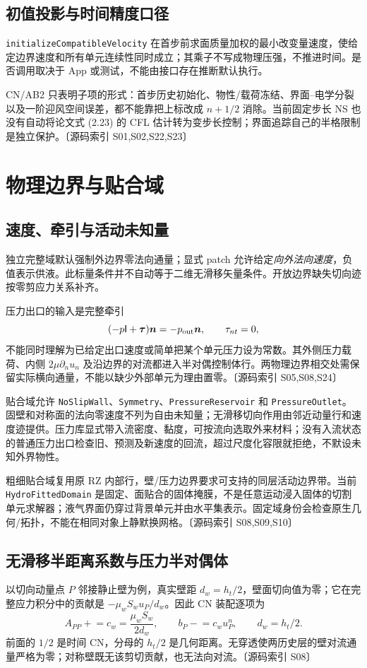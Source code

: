 \documentclass[UTF8,a4paper,11pt,fontset=fandol]{ctexart}
\newcommand{\code}[1]{\nolinkurl{#1}}
\newcommand{\src}[1]{\textcolor{ink}{\small〔源码索引 #1〕}}
\newcommand{\mat}[1]{\mathsf{#1}}
\begin{document}
\subsection{初值投影与时间精度口径}
\code{initializeCompatibleVelocity} 在首步前求面质量加权的最小改变量速度，使给定边界速度和所有单元连续性同时成立；其乘子不写成物理压强，不推进时间。是否调用取决于 App 或测试，不能由接口存在推断默认执行。

CN/AB2 只表明子项的形式：首步历史初始化、物性/载荷冻结、界面--电学分裂以及一阶迎风空间误差，都不能靠把上标改成 $n+1/2$ 消除。当前固定步长 NS 也没有自动将论文式 (2.23) 的 CFL 估计转为变步长控制；界面追踪自己的半格限制是独立保护。\src{S01,S02,S22,S23}


\section{物理边界与贴合域}
\subsection{速度、牵引与活动未知量}
独立完整域默认强制外边界零法向通量；显式 patch 允许给定\emph{向外法向速度}，负值表示供液。此标量条件并不自动等于二维无滑移矢量条件。开放边界缺失切向迹按零剪应力关系补齐。

压力出口的输入是完整牵引
\begin{equation}
 (-p\mat I+\bm\tau)\bm n=-p_{\rm out}\bm n,
 \qquad\tau_{nt}=0,
\end{equation}
不能同时理解为已给定出口速度或简单把某个单元压力设为常数。其外侧压力载荷、内侧 $2\mu\partial_n u_n$ 及沿边界的对流都进入半对偶控制体行。两物理边界相交处需保留实际横向通量，不能以缺少外部单元为理由置零。\src{S05,S08,S24}

贴合域允许 \code{NoSlipWall}、\code{Symmetry}、\code{PressureReservoir} 和 \code{PressureOutlet}。固壁和对称面的法向零速度不列为自由未知量；无滑移切向作用由邻近动量行和速度迹提供。压力库显式带入流密度、黏度，可按流向选取外来材料；没有入流状态的普通压力出口检查旧、预测及新速度的回流，超过尺度化容限就拒绝，不默设未知外界物性。

粗细贴合域复用原 RZ 内部行，壁/压力边界要求可支持的同层活动边界带。当前 \code{HydroFittedDomain} 是固定、面贴合的固体掩膜，不是任意运动浸入固体的切割单元求解器；液气界面仍穿过背景单元并由水平集表示。固定域身份会检查原生几何/拓扑，不能在相同对象上静默换网格。\src{S08,S09,S10}


\subsection{无滑移半距离系数与压力半对偶体}
以切向动量点 $P$ 邻接静止壁为例，真实壁距 $d_w=h_t/2$，壁面切向值为零；它在完整应力积分中的贡献是 $-\mu_w S_w u_P/d_w$。因此 CN 装配逐项为
\begin{equation}
 A_{PP}\mathrel{+}=c_w=\frac{\mu_wS_w}{2d_w},\qquad
 b_P\mathrel{-}=c_wu_P^n,\qquad d_w=h_t/2.
\end{equation}
前面的 $1/2$ 是时间 CN，分母的 $h_t/2$ 是几何距离。无穿透使两历史层的壁对流通量严格为零；对称壁既无该剪切贡献，也无法向对流。\src{S08}
\end{document}
